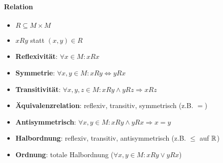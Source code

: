 \paragraph{Relation}
\begin{itemize}
  \item $R \subseteq M \times M$
  \item $xRy$ statt $(x,y) \in R$
  \item \textbf{Reflexivität}: $\forall x \in M: xRx$
  \item \textbf{Symmetrie}: $\forall x,y \in M: xRy \Leftrightarrow yRx$
  \item \textbf{Transitivität}: $\forall x,y,z \in M: xRy \wedge yRz \Rightarrow xRz$
  \item \textbf{Äquivalenzrelation}: reflexiv, transitiv, symmetrisch (z.B. $=$)
  \item \textbf{Antisymmetrisch}: $\forall x,y \in M: xRy \wedge yRx \Rightarrow x=y$
  \item \textbf{Halbordnung}: reflexiv, transitiv, antisymmetrisch (z.B. $\leq$ auf $\mathbb{R}$)
  \item \textbf{Ordnung}: totale Halbordnung ($\forall x,y \in M: xRy \vee yRx$)
\end{itemize}